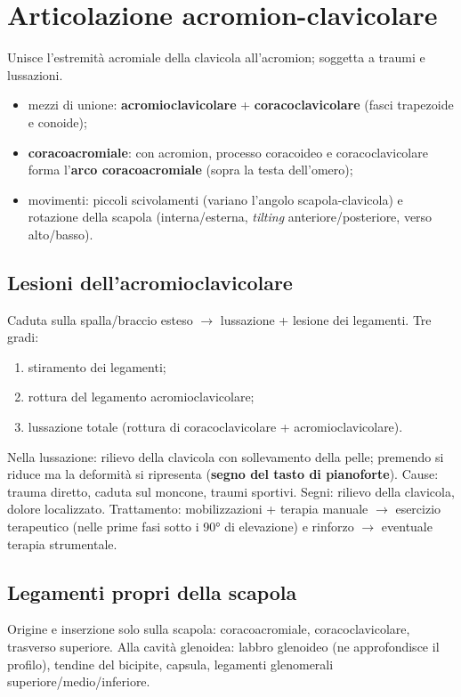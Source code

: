 \section{Articolazione acromion-clavicolare}

Unisce l'estremità acromiale della clavicola all'acromion; soggetta a traumi e lussazioni.
\begin{itemize}
  \item mezzi di unione: \textbf{acromioclavicolare} + \textbf{coracoclavicolare} (fasci trapezoide
    e conoide);
  \item \textbf{coracoacromiale}: con acromion, processo coracoideo e coracoclavicolare forma
    l'\textbf{arco coracoacromiale} (sopra la testa dell'omero);
  \item movimenti: piccoli scivolamenti (variano l'angolo scapola-clavicola) e rotazione della
    scapola (interna/esterna, \textit{tilting} anteriore/posteriore, verso alto/basso).
\end{itemize}

\subsection{Lesioni dell'acromioclavicolare}
Caduta sulla spalla/braccio esteso $\rightarrow$ lussazione + lesione dei legamenti. Tre gradi:
\begin{enumerate}
  \item stiramento dei legamenti;
  \item rottura del legamento acromioclavicolare;
  \item lussazione totale (rottura di coracoclavicolare + acromioclavicolare).
\end{enumerate}
Nella lussazione: rilievo della clavicola con sollevamento della pelle; premendo si riduce ma la
deformità si ripresenta (\textbf{segno del tasto di pianoforte}). Cause: trauma diretto, caduta sul
moncone, traumi sportivi. Segni: rilievo della clavicola, dolore localizzato. Trattamento:
mobilizzazioni + terapia manuale $\rightarrow$ esercizio terapeutico (nelle prime fasi sotto i 90°
di elevazione) e rinforzo $\rightarrow$ eventuale terapia strumentale.

\subsection{Legamenti propri della scapola}
Origine e inserzione solo sulla scapola: coracoacromiale, coracoclavicolare, trasverso superiore.
Alla cavità glenoidea: labbro glenoideo (ne approfondisce il profilo), tendine del bicipite, capsula,
legamenti glenomerali superiore/medio/inferiore.

